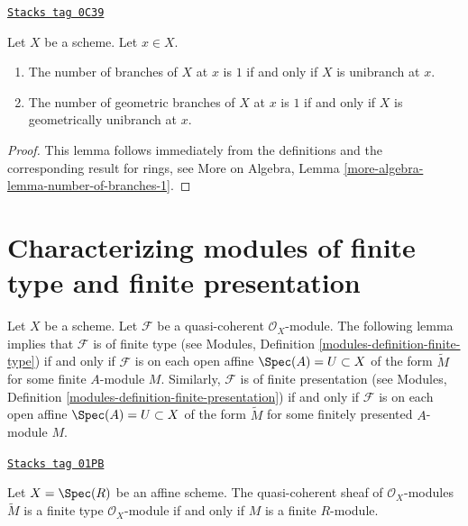 \begin{lemma}
\label{properties-lemma-number-of-branches-1}
\href{https://stacks.math.columbia.edu/tag/0C39}{\texttt{Stacks tag 0C39}}

Let $X$ be a scheme. Let $x \in X$.
\begin{enumerate}
\item The number of branches of $X$ at $x$ is $1$ if and only if
$X$ is unibranch at $x$.
\item The number of geometric branches of $X$ at $x$ is $1$ if and only if
$X$ is geometrically unibranch at $x$.
\end{enumerate}
\end{lemma}

\begin{proof}
This lemma follows immediately from the definitions and the corresponding
result for rings, see More on Algebra, Lemma
\ref{more-algebra-lemma-number-of-branches-1}.
\end{proof}

\section{Characterizing modules of finite type and finite presentation}
\label{properties-section-characterizing-finite-type-presentation}
Let $X$ be a scheme.
Let $\mathcal{F}$ be a quasi-coherent $\mathcal{O}_X$-module.
The following lemma implies that $\mathcal{F}$ is of finite type
(see Modules, Definition \ref{modules-definition-finite-type})
if and only if $\mathcal{F}$ is
on each open affine $\Spec(A) = U \subset X$
of the form $\widetilde M$ for some finite $A$-module $M$.
Similarly, $\mathcal{F}$ is of finite presentation
(see Modules, Definition \ref{modules-definition-finite-presentation})
if and only if $\mathcal{F}$ is
on each open affine $\Spec(A) = U \subset X$
of the form $\widetilde M$ for some finitely presented $A$-module $M$.

\begin{lemma}
\label{properties-lemma-finite-type-module}
\href{https://stacks.math.columbia.edu/tag/01PB}{\texttt{Stacks tag 01PB}}

Let $X = \Spec(R)$ be an affine scheme.
The quasi-coherent sheaf of $\mathcal{O}_X$-modules
$\widetilde M$ is a finite type $\mathcal{O}_X$-module
if and only if $M$ is a finite $R$-module.
\end{lemma}

